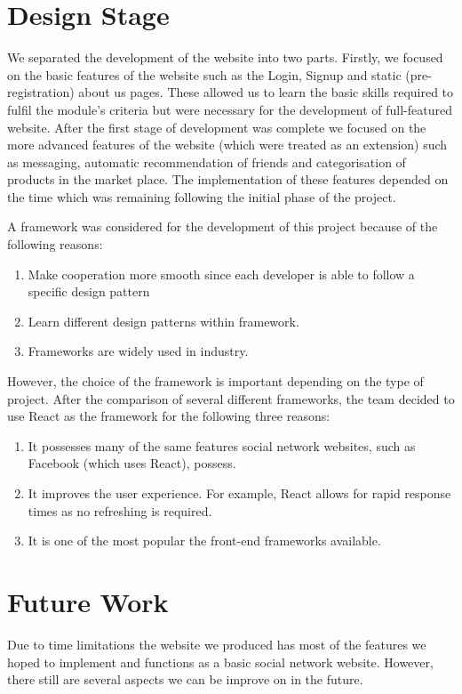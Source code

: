 \documentclass[a4paper]{article}
\begin{document}
\section{Design Stage}
We separated the development of the website into two parts. Firstly, we focused on the basic features of the website such as the Login, Signup and static (pre-registration) about us pages. These allowed us to learn the basic skills required to fulfil the module's criteria but were necessary for the development of full-featured website. After the first stage of development was complete we focused on the more advanced features of the website (which were treated as an extension) such as messaging, automatic recommendation of friends and categorisation of products in the market place. The implementation of these features depended on the time which was remaining following the initial phase of the project.

A framework was considered for the development of this project because of the following reasons: 
\begin{enumerate}
    \item Make cooperation more smooth since each developer is able to follow a specific design pattern
    \item Learn different design patterns within framework.
    \item Frameworks are widely used in industry. 
\end{enumerate}
However, the choice of the framework is important depending on the type of project. After the comparison of several different frameworks, the team decided to use React as the framework for the following three reasons: 
\begin{enumerate}
    \item It possesses many of the same features social network websites, such as Facebook (which uses React), possess. 
    \item It improves the user experience. For example, React allows for rapid response times as no refreshing is required. 
    \item It is one of the most popular the front-end frameworks available.
\end{enumerate}

\section{Future Work}
Due to time limitations the website we produced has most of the features we hoped to implement and functions as a basic social network website. However, there still are several aspects we can be improve on in the future.
\end{document}
